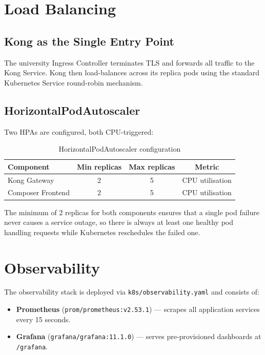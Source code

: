 \documentclass[12pt,a4paper,oneside]{report}
\begin{document}
\section{Load Balancing}

\subsection{Kong as the Single Entry Point}

The university Ingress Controller terminates TLS and forwards all traffic to the Kong Service. Kong then load-balances across its replica pods using the standard Kubernetes Service round-robin mechanism.

\subsection{HorizontalPodAutoscaler}

Two HPAs are configured, both CPU-triggered:

\begin{table}[H]
\centering
\caption{HorizontalPodAutoscaler configuration}
\label{tab:hpa}
\renewcommand{\arraystretch}{1.3}
\begin{tabular}{l c c c}
\toprule
\textbf{Component} & \textbf{Min replicas} & \textbf{Max replicas} & \textbf{Metric} \\
\midrule
Kong Gateway       & 2 & 5 & CPU utilisation \\
Composer Frontend  & 2 & 5 & CPU utilisation \\
\bottomrule
\end{tabular}
\end{table}

The minimum of 2 replicas for both components ensures that a single pod failure never causes a service outage, so there is always at least one healthy pod handling requests while Kubernetes reschedules the failed one.

\section{Observability}

The observability stack is deployed via \texttt{k8s/observability.yaml} and consists of:

\begin{itemize}[noitemsep]
  \item \textbf{Prometheus} (\texttt{prom/prometheus:v2.53.1}) — scrapes all application services every 15 seconds.
  \item \textbf{Grafana} (\texttt{grafana/grafana:11.1.0}) — serves pre-provisioned dashboards at \texttt{/grafana}.
\end{itemize}
\end{document}
